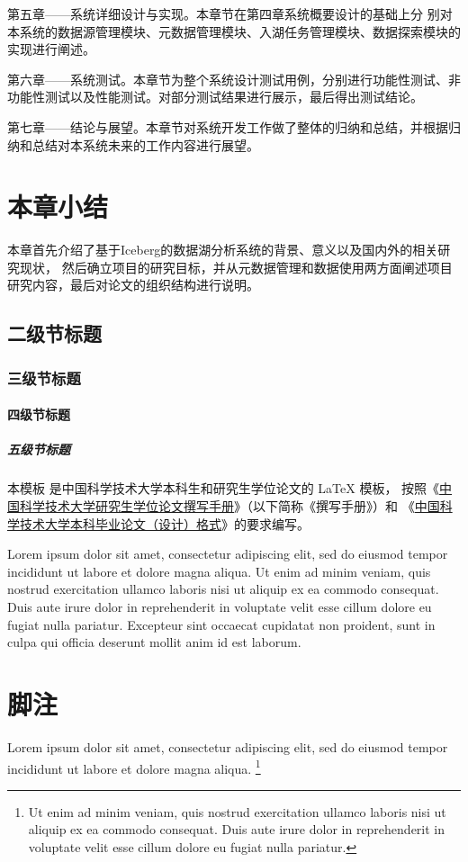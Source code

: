 第五章——系统详细设计与实现。本章节在第四章系统概要设计的基础上分
别对本系统的数据源管理模块、元数据管理模块、入湖任务管理模块、数据探索模块的实现进行阐述。

第六章——系统测试。本章节为整个系统设计测试用例，分别进行功能性测试、非功能性测试以及性能测试。对部分测试结果进行展示，最后得出测试结论。

第七章——结论与展望。本章节对系统开发工作做了整体的归纳和总结，并根据归纳和总结对本系统未来的工作内容进行展望。

\section{本章小结}

本章首先介绍了基于Iceberg的数据湖分析系统的背景、意义以及国内外的相关研究现状，
然后确立项目的研究目标，并从元数据管理和数据使用两方面阐述项目研究内容，最后对论文的组织结构进行说明。


\subsection{二级节标题}

\subsubsection{三级节标题}

\paragraph{四级节标题}

\subparagraph{五级节标题}

本模板  是中国科学技术大学本科生和研究生学位论文的 \LaTeX{}
模板， 按照《\href{https://gradschool.ustc.edu.cn/static/upload/article/picture/ce3b02e5f0274c90b9331ef50ae1ac26.pdf}
{中国科学技术大学研究生学位论文撰写手册}》（以下简称《撰写手册》）和
《\href{https://www.teach.ustc.edu.cn/?attachment_id=13867}
{中国科学技术大学本科毕业论文（设计）格式}》的要求编写。

Lorem ipsum dolor sit amet, consectetur adipiscing elit, sed do eiusmod tempor
incididunt ut labore et dolore magna aliqua.
Ut enim ad minim veniam, quis nostrud exercitation ullamco laboris nisi ut
aliquip ex ea commodo consequat.
Duis aute irure dolor in reprehenderit in voluptate velit esse cillum dolore eu
fugiat nulla pariatur.
Excepteur sint occaecat cupidatat non proident, sunt in culpa qui officia
deserunt mollit anim id est laborum.



\section{脚注}

Lorem ipsum dolor sit amet, consectetur adipiscing elit, sed do eiusmod tempor
incididunt ut labore et dolore magna aliqua.
\footnote{Ut enim ad minim veniam, quis nostrud exercitation ullamco laboris
  nisi ut aliquip ex ea commodo consequat.
  Duis aute irure dolor in reprehenderit in voluptate velit esse cillum dolore
  eu fugiat nulla pariatur.}
